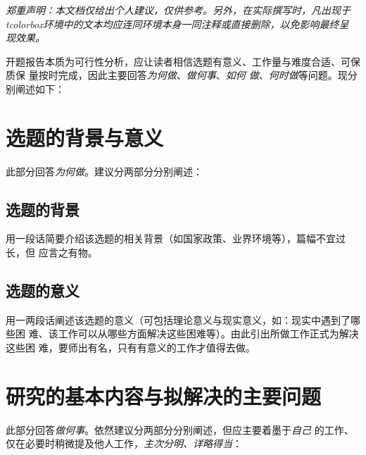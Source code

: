 \begin{tcolorbox}
	\emph{郑重声明：本文档仅给出个人建议，仅供参考。另外，在实际撰写时，凡出现于
		tcolorbox环境中的文本均应连同环境本身一同注释或直接删除，以免影响最终呈
		现效果。}
\end{tcolorbox}

\begin{tcolorbox}
	开题报告本质为可行性分析，应让读者相信选题有意义、工作量与难度合适、可保质保
	量按时完成，因此主要回答\emph{为何做}、\emph{做何事}、\emph{如何
		做}、\emph{何时做}等问题。现分别阐述如下：
\end{tcolorbox}

\section{选题的背景与意义}

\begin{tcolorbox}
	此部分回答\emph{为何做}。建议分两部分分别阐述：
\end{tcolorbox}

\subsection{选题的背景}

\begin{tcolorbox}
	用一段话简要介绍该选题的相关背景（如国家政策、业界环境等），篇幅不宜过长，但
	应言之有物。
\end{tcolorbox}

\subsection{选题的意义}

\begin{tcolorbox}
	用一两段话阐述该选题的意义（可包括理论意义与现实意义，如：现实中遇到了哪些困
	难、该工作可以从哪些方面解决这些困难等）。由此引出所做工作正式为解决这些困
	难，要师出有名，只有有意义的工作才值得去做。
\end{tcolorbox}

\section{研究的基本内容与拟解决的主要问题}

\begin{tcolorbox}
	此部分回答\emph{做何事}。依然建议分两部分分别阐述，但应主要着墨于\emph{自己}
	的工作、仅在必要时稍微提及他人工作，\emph{主次分明、详略得当}：
\end{tcolorbox}

